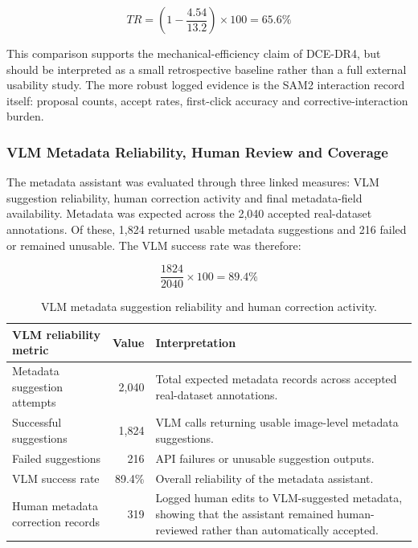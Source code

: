 \begin{equation}
TR = \left(1 - \frac{4.54}{13.2}\right) \times 100 = 65.6\%
\end{equation}

This comparison supports the mechanical-efficiency claim of DCE-DR4, but should be interpreted as a small retrospective baseline rather than a full external usability study. The more robust logged evidence is the SAM2 interaction record itself: proposal counts, accept rates, first-click accuracy and corrective-interaction burden.

\subsubsection{VLM Metadata Reliability, Human Review and Coverage}

The metadata assistant was evaluated through three linked measures: VLM suggestion reliability, human correction activity and final metadata-field availability. Metadata was expected across the 2,040 accepted real-dataset annotations. Of these, 1,824 returned usable metadata suggestions and 216 failed or remained unusable. The VLM success rate was therefore:

\begin{equation}
\frac{1824}{2040} \times 100 = 89.4\%
\end{equation}

\begin{table}[H]
\centering
\small
\renewcommand{\arraystretch}{1.2}
\begin{tabularx}{\textwidth}{p{} r X}
\toprule
\textbf{VLM reliability metric} & \textbf{Value} & \textbf{Interpretation} \\
\midrule
Metadata suggestion attempts & 2,040 & Total expected metadata records across accepted real-dataset annotations. \\
Successful suggestions & 1,824 & VLM calls returning usable image-level metadata suggestions. \\
Failed suggestions & 216 & API failures or unusable suggestion outputs. \\
VLM success rate & 89.4\% & Overall reliability of the metadata assistant. \\
Human metadata correction records & 319 & Logged human edits to VLM-suggested metadata, showing that the assistant remained human-reviewed rather than automatically accepted. \\
\bottomrule
\end{tabularx}
\caption{VLM metadata suggestion reliability and human correction activity.}
\label{tab:dce_results_vlm_reliability}
\end{table}

